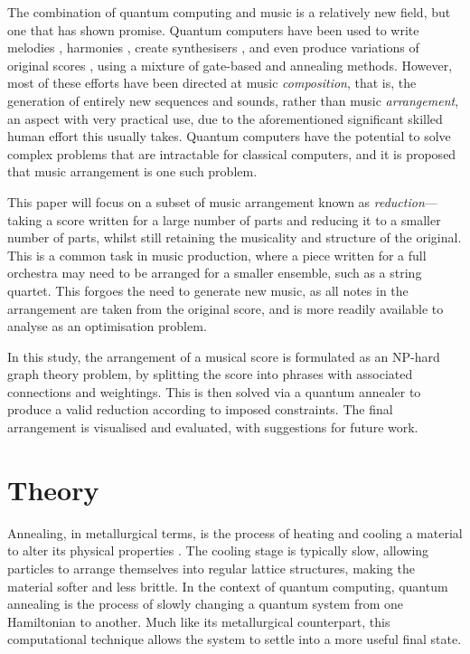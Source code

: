 \documentclass[aps,pra,12pt,onecolumn]{revtex4-2}
\begin{document}
The combination of quantum computing and music is a relatively new field, but one that has shown promise. Quantum computers have been used to write melodies \cite{arya_music_2022}, harmonies \cite{freedline_algorhythms_2021}, create synthesisers \cite{miranda_hello_2020}, and even produce variations of original scores \cite{miranda_impossible_2022}, using a mixture of gate-based and annealing methods. However, most of these efforts have been directed at music \textit{composition}, that is, the generation of entirely new sequences and sounds, rather than music \textit{arrangement}, an aspect with very practical use, due to the aforementioned significant skilled human effort this usually takes. Quantum computers have the potential to solve complex problems that are intractable for classical computers, and it is proposed that music arrangement is one such problem.

This paper will focus on a subset of music arrangement known as \textit{reduction}—taking a score written for a large number of parts and reducing it to a smaller number of parts, whilst still retaining the musicality and structure of the original. This is a common task in music production, where a piece written for a full orchestra may need to be arranged for a smaller ensemble, such as a string quartet. This forgoes the need to generate new music, as all notes in the arrangement are taken from the original score, and is more readily available to analyse as an optimisation problem.

In this study, the arrangement of a musical score is formulated as an NP-hard graph theory problem, by splitting the score into phrases with associated connections and weightings. This is then solved via a quantum annealer to produce a valid reduction according to imposed constraints. The final arrangement is visualised and evaluated, with suggestions for future work.

\clearpage

\section{Theory}

Annealing, in metallurgical terms, is the process of heating and cooling a material to alter its physical properties \cite{oed_annealing_2024}. The cooling stage is typically slow, allowing particles to arrange themselves into regular lattice structures, making the material softer and less brittle. In the context of quantum computing, quantum annealing is the process of slowly changing a quantum system from one Hamiltonian to another. Much like its metallurgical counterpart, this computational technique allows the system to settle into a more useful final state.
\end{document}
